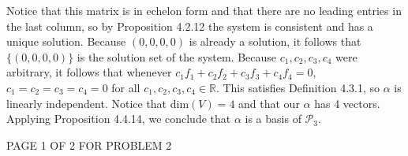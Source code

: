\documentclass[12pt]{article}
\newenvironment{problem}[2][Problem]
{
	\begin{trivlist} 
		\item[\hskip \labelsep {\bfseries #1 #2:}]
	}
{
	\end{trivlist}
	}
\newenvironment{solution}[1][Solution]
{
	\begin{trivlist} 
		\item[\hskip \labelsep {\itshape #1:}]
	}
	{
	\end{trivlist}
}
\begin{document}
\begin{problem}{2}
\begin{solution}
\[\]
Notice that this matrix is in echelon form and that there are no leading entries in the last column, so by Proposition 4.2.12 the system is consistent and has a unique solution. Because $(0,0,0,0)$ is already a solution, it follows that $\{(0,0,0,0)\}$ is the solution set of the system. Because $c_1,c_2,c_3,c_4$ were arbitrary, it follows that whenever $c_1 f_1 + c_2 f_2 + c_3 f_3+c_4 f_4 =0$, $c_1=c_2=c_3=c_4=0$ for all $c_1,c_2,c_3,c_4 \in \mathbb{R}$. This satisfies Definition 4.3.1, so $\alpha$ is linearly independent. Notice that dim$(V) = 4$ and that our $\alpha$ has 4 vectors. Applying Proposition 4.4.14, we conclude that $\alpha$ is a basis of $\mathcal{P}_3$.
\end{solution}
\vfill
\centerline{PAGE 1 OF 2 FOR PROBLEM 2}
\end{problem}
\end{document}
